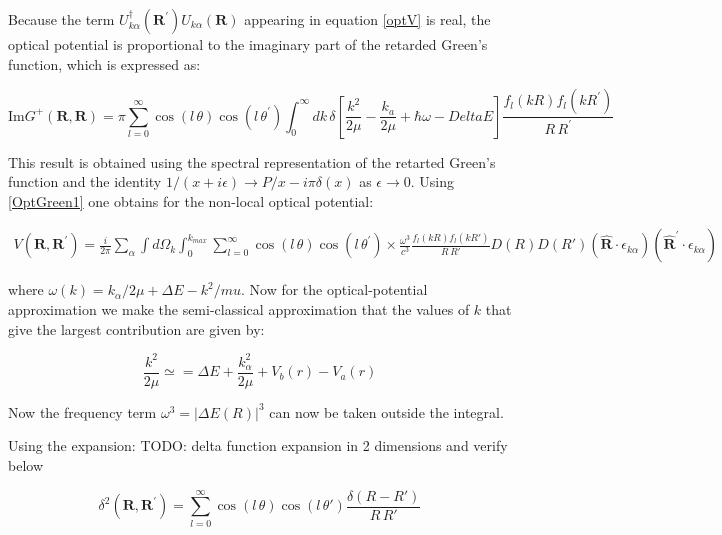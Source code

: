 Because the term $ U_{k\alpha}^{\dagger}(\mathbf{R}^{'})U_{k\alpha}(\mathbf{R}) $ appearing in equation \eqref{optV} is real, the optical potential is proportional to the imaginary part of the retarded Green's function, which is expressed as:

\begin{equation}\label{OptGreen1}
\text{Im} G^{+}(\mathbf{R},\mathbf{R}) = \pi\sum_{l=0}^{\infty}{\cos(l\, \theta)\cos(l\,\theta^{'})\int_0^{\infty}{dk\,\delta\left[\frac{k^2}{2\mu} - \frac{k_a}{2\mu} + \hbar\omega - Delta E \right]\frac{f_l(kR)f_l(kR^{'})}{R\,R^{'}} }  }
\end{equation}

This result is obtained using the spectral representation of the retarted Green's function and the identity $ 1/(x + i\epsilon) \rightarrow P/x - i\pi\delta(x) $ as $ \epsilon \rightarrow 0 $. Using \eqref{OptGreen1} one obtains for the non-local optical potential:

\begin{equation}\label{optV1}
\begin{split}
V(\mathbf{R},\mathbf{R}^{'}) = \frac{i}{2\pi}\sum_{\alpha}\int{d\Omega_k}\int_0^{k_{max}}{\sum_{l=0}^{\infty}{\cos(l\, \theta)\cos(l\,\theta^{'})\times\frac{\omega^3}{c^3}\frac{f_l(kR)f_l(kR')}{R\,R'}D(R)D(R')(\hat{\mathbf{R}}\cdot\epsilon_{k\alpha})(\hat{\mathbf{R}}^{'}\cdot\epsilon_{k\alpha}) } }  
\end{split}
\end{equation}

where $ \omega(k) = k_{\alpha}/2\mu + \Delta E - k^2/mu $.  Now for the optical-potential approximation we make the semi-classical approximation that the values of $ k $ that give the largest contribution are given by:

\begin{equation}
\frac{k^2}{2\mu} \simeq = \Delta E + \frac{k_{\alpha}^2}{2\mu} + V_b(r) - V_a(r)
\end{equation}

Now the frequency term $ \omega^3 = \left|\Delta E(R)\right|^3 $ can now be taken outside the integral.

Using the expansion: TODO: delta function expansion in 2 dimensions and verify below

\begin{equation}
\delta^2\left(\mathbf{R},\mathbf{R}^{'}\right) = \sum_{l=0}^{\infty}{\cos(l\,\theta)\cos(l\,\theta')\frac{\delta(R - R')}{R\,R'}}
\end{equation}

